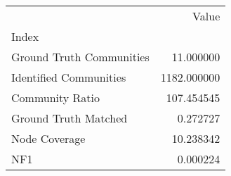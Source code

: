 \begin{tabular}{lr}
\toprule
{} &        Value \\
Index                    &              \\
\midrule
Ground Truth Communities &    11.000000 \\
Identified Communities   &  1182.000000 \\
Community Ratio          &   107.454545 \\
Ground Truth Matched     &     0.272727 \\
Node Coverage            &    10.238342 \\
NF1                      &     0.000224 \\
\bottomrule
\end{tabular}
